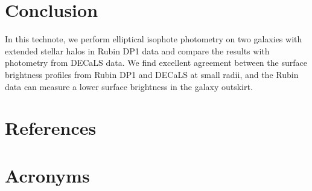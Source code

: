 \documentclass[SE,lsstdraft,authoryear,toc]{lsstdoc}
\begin{document}
\section{Conclusion}
In this technote, we perform elliptical isophote photometry on two galaxies with extended stellar halos in Rubin DP1 data and compare the results with photometry from DECaLS data. We find excellent agreement between the surface brightness profiles from Rubin DP1 and DECaLS at small radii, and the Rubin data can measure a lower surface brightness in the galaxy outskirt.


\appendix
\section{References} \label{sec:bib}
\renewcommand{\refname}{} %


\section{Acronyms} \label{sec:acronyms}

\end{document}
